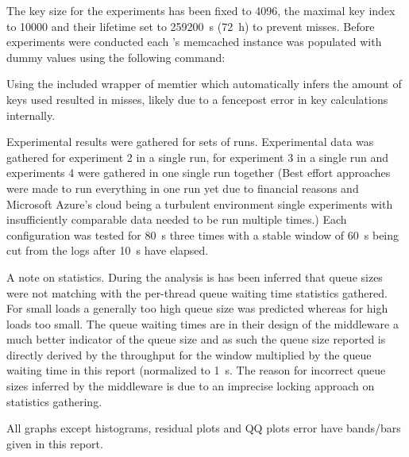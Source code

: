         The key size for the experiments has been fixed to \SI{4096}{\byte}, the maximal key index to 10000 and their
        lifetime set to \SI{259200}{\second} (\SI{72}{\hour}) to prevent misses. Before experiments were conducted
        each \srv{}'s memcached instance was populated with dummy values using the following command:

        Using the included wrapper of memtier which automatically infers the amount of keys used resulted in misses,
        likely due to a fencepost error in key calculations internally.

        Experimental results were gathered for sets of runs. Experimental data was gathered for experiment 2 in a
        single run, for experiment 3 in a single run and experiments 4 were gathered in one single run
        together (Best effort approaches were made to run everything in one run yet due to financial reasons and
        Microsoft Azure's cloud being a turbulent environment single experiments with insufficiently comparable data
        needed to be run multiple times.) Each configuration was tested for \SI{80}{\second} three times with a stable
        window of \SI{60}{\second} being cut from the logs after \SI{10}{\second} have elapsed.

        A note on statistics. During the analysis is has been inferred that queue sizes were not matching with the
        per-thread queue waiting time statistics gathered. For small loads a generally too high queue size was predicted
        whereas for high loads too small. The queue waiting times are in their design of the middleware a much better
        indicator of the queue size and as such the queue size reported is directly derived by the throughput for the
        window multiplied by the queue waiting time in this report (normalized to \SI{1}{\second}. The reason for
        incorrect queue sizes inferred by the middleware is due to an imprecise locking approach on statistics
        gathering.

        All graphs except histograms, residual plots and QQ plots error have bands/bars given in this report.
